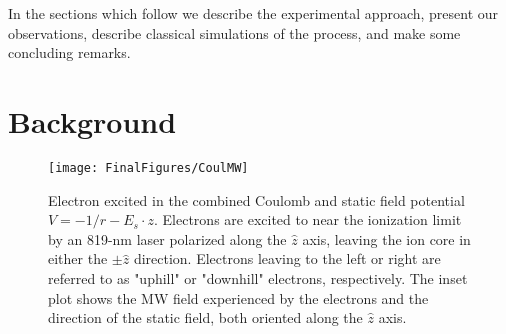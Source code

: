 \documentclass[aps,pra,preprint,groupedaddress]{revtex4-1}
\begin{document}
In the sections which follow we describe the experimental approach, present our observations, describe classical simulations of the process, and make some concluding remarks.


\section{\label{sec:back} Background}

\begin{figure}
	\texttt{[image: FinalFigures/CoulMW]}
	\caption{Electron excited in the combined Coulomb and static field potential $V = -1/r - E_s \cdot z$. Electrons are excited to near the ionization limit by an 819-nm laser polarized along the $\hat{z}$ axis, leaving the ion core in either the $\pm \hat{z}$ direction. Electrons leaving to the left or right are referred to as "uphill" or "downhill" electrons, respectively. The inset plot shows the MW field experienced by the electrons and the direction of the static field, both oriented along the $\hat{z}$ axis.}
	\label{fig:CoulMW}
\end{figure}







\end{document}
